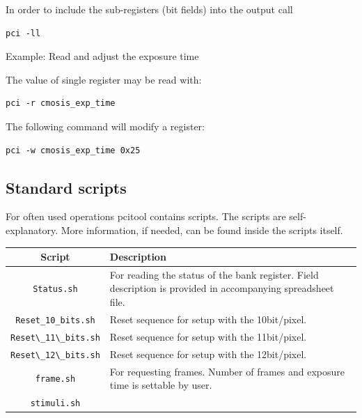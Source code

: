 In order to include the sub-registers (bit fields) into the output call
\begin{verbatim}
pci -ll
\end{verbatim}

Example: Read and adjust the exposure time

The value of single register may be read with:
\begin{verbatim}
pci -r cmosis_exp_time
\end{verbatim}

The following command will modify a register:
\begin{verbatim}
pci -w cmosis_exp_time 0x25
\end{verbatim}



\subsection{Standard scripts}

For often used operations pcitool contains scripts.
The scripts are self-explanatory. More information, if needed, can be found inside the scripts itself.

\begin{tabular}{|c|p{10cm}|}
\hline
Script						& Description \\
\hline
\verb/Status.sh/			& For reading the status of the bank register. Field description is provided in accompanying spreadsheet file. \\
\hline
\verb/Reset_10_bits.sh/ 	& Reset sequence for setup with the 10bit/pixel. \\
\hline

\verb/Reset\_11\_bits.sh/ 	& Reset sequence for setup with the 11bit/pixel. \\
\hline
\verb/Reset\_12\_bits.sh/ 	& Reset sequence for setup with the 12bit/pixel. \\
\hline
\verb/frame.sh/ 			& For requesting frames. Number of frames and exposure time is settable by user. \\
\verb/stimuli.sh/			& \\
\hline
\end{tabular}




